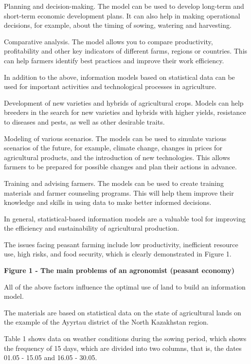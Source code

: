 Planning and decision-making. The model can be used to develop long-term
and short-term economic development plans. It can also help in making
operational decisions, for example, about the timing of sowing, watering
and harvesting.

Comparative analysis. The model allows you to compare productivity,
profitability and other key indicators of different farms, regions or
countries. This can help farmers identify best practices and improve
their work efficiency.

In addition to the above, information models based on statistical data
can be used for important activities and technological processes in
agriculture.

Development of new varieties and hybrids of agricultural crops. Models
can help breeders in the search for new varieties and hybrids with
higher yields, resistance to diseases and pests, as well as other
desirable traits.

Modeling of various scenarios. The models can be used to simulate
various scenarios of the future, for example, climate change, changes in
prices for agricultural products, and the introduction of new
technologies. This allows farmers to be prepared for possible changes
and plan their actions in advance.

Training and advising farmers. The models can be used to create training
materials and farmer counseling programs. This will help them improve
their knowledge and skills in using data to make better informed
decisions.

In general, statistical-based information models are a valuable tool for
improving the efficiency and sustainability of agricultural production.

The issues facing peasant farming include low productivity, inefficient
resource use, high risks, and food security, which is clearly
demonstrated in Figure 1.

{\bfseries Figure 1 - The main problems of an agronomist (peasant economy)}

All of the above factors influence the optimal use of land to build an
information model.

The materials are based on statistical data on the state of agricultural
lands on the example of the Ayyrtau district of the North Kazakhstan
region.

Table 1 shows data on weather conditions during the sowing period, which
shows the frequency of 15 days, which are divided into two columns, that
is, the dates 01.05 - 15.05 and 16.05 - 30.05.

